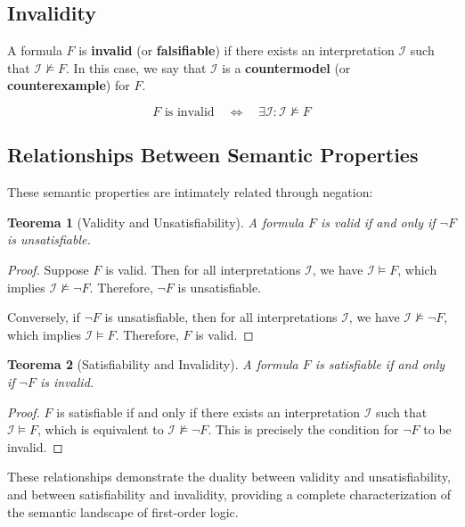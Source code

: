 \documentclass[11pt,a4paper]{article}
\theoremstyle{definition}
\theoremstyle{plain}
\newtheorem{theorem}{Teorema}[section]
\theoremstyle{remark}
\begin{document}
\subsection{Invalidity}

A formula $F$ is \textbf{invalid} (or \textbf{falsifiable}) if there exists an interpretation $\mathcal{I}$ such that $\mathcal{I} \not\models F$. In this case, we say that $\mathcal{I}$ is a \textbf{countermodel} (or \textbf{counterexample}) for $F$.

\[
F \text{ is invalid} \quad \Leftrightarrow \quad \exists \mathcal{I} : \mathcal{I} \not\models F
\]

\subsection{Relationships Between Semantic Properties}

These semantic properties are intimately related through negation:

\begin{theorem}[Validity and Unsatisfiability]
A formula $F$ is valid if and only if $\neg F$ is unsatisfiable.
\end{theorem}

\begin{proof}
Suppose $F$ is valid. Then for all interpretations $\mathcal{I}$, we have $\mathcal{I} \models F$, which implies $\mathcal{I} \not\models \neg F$. Therefore, $\neg F$ is unsatisfiable.

Conversely, if $\neg F$ is unsatisfiable, then for all interpretations $\mathcal{I}$, we have $\mathcal{I} \not\models \neg F$, which implies $\mathcal{I} \models F$. Therefore, $F$ is valid.
\end{proof}

\begin{theorem}[Satisfiability and Invalidity]
A formula $F$ is satisfiable if and only if $\neg F$ is invalid.
\end{theorem}

\begin{proof}
$F$ is satisfiable if and only if there exists an interpretation $\mathcal{I}$ such that $\mathcal{I} \models F$, which is equivalent to $\mathcal{I} \not\models \neg F$. This is precisely the condition for $\neg F$ to be invalid.
\end{proof}

These relationships demonstrate the duality between validity and unsatisfiability, and between satisfiability and invalidity, providing a complete characterization of the semantic landscape of first-order logic.
\end{document}
